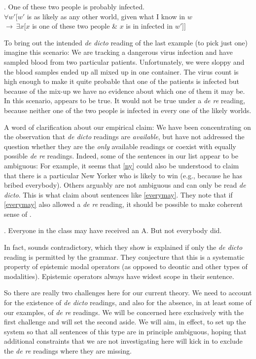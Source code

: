 \ex. One of these two people is probably infected.\\
$\forall w'[w'$ is as likely as any other world, given what I know in $w$\\
\null\hfill$ \rightarrow\ \exists x[x$ is one of these two people \& $x$ is in infected in $w'$]]

To bring out the intended \emph{de dicto} reading of the last example (to pick just one) imagine this scenario: We are tracking a dangerous virus infection and have sampled blood from two particular patients. Unfortunately, we were sloppy and the blood samples ended up all mixed up in one container. The virus count is high enough to make it quite probable that one of the patients is infected but because of the mix-up we have no evidence about which one of them it may be. In this scenario, \Last appears to be true. It would not be true under a \emph{de re} reading, because neither one of the two people is infected in every one of the likely worlds.

A word of clarification about our empirical claim: We have been concentrating on the observation that \emph{de dicto} readings are \emph{available}, but have not addressed the question whether they are the \emph{only} available readings or coexist with equally possible \emph{de re} readings. Indeed, some of the sentences in our list appear to be ambiguous: For example, it seems that \ref{ny} could also be understood to claim that there is a particular New Yorker who is likely to win (e.g., because he has bribed everybody). Others arguably are not ambiguous and can only be read \emph{de dicto}. This is what \citet{fintel-iatridou:2003:ec} claim about sentences like \ref{everymay}. They note that if \ref{everymay} also allowed a \emph{de re} reading, it should be possible to make coherent sense of \Next.

\ex. Everyone in the class may have received an A. But not everybody did.

In fact, \Last sounds contradictory, which they show is explained if only the \emph{de dicto} reading is permitted by the grammar. They conjecture that this is a systematic property of epistemic modal operators (as opposed to deontic and other types of modalities). Epistemic operators always have widest scope in their sentence.

So there are really two challenges here for our current theory. We need to account for the existence of \emph{de dicto} readings, and also for the absence, in at least some of our examples, of \emph{de re} readings. We will be concerned here exclusively with the first challenge and will set the second aside. We will aim, in effect, to set up the system so that all sentences of this type are in principle ambiguous, hoping that additional constraints that we are not investigating here will kick in to exclude the \emph{de re} readings where they are missing.

